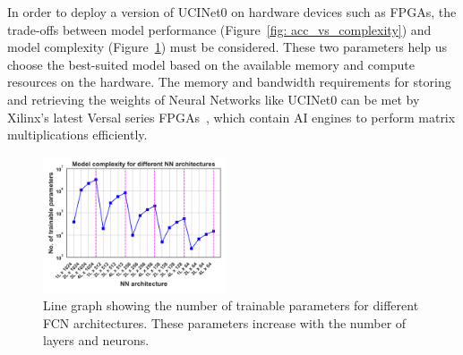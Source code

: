 \documentclass[journal]{IEEEtran}
\begin{document}
In order to deploy a version of UCINet0 on hardware devices such as FPGAs, the trade-offs between model performance (Figure~\ref{fig: acc_vs_complexity}) and model complexity (Figure~\ref{fig: weights_complexity}) must be considered. These two parameters help us choose the best-suited model based on the available memory and compute resources on the hardware. The memory and bandwidth requirements for storing and retrieving the weights of Neural Networks like UCINet0 can be met by Xilinx's latest Versal series FPGAs~\cite{wierse2023evaluation}, which contain AI engines to perform matrix multiplications efficiently.


\begin{figure}[h]
\centering
\includegraphics[width=0.48\textwidth]{Figures/Hw_num_weights_analysis_all_arch_epochs_150.png}
\caption{Line graph showing the number of trainable parameters for different FCN architectures. These parameters increase with the number of layers and neurons.}
\label{fig: weights_complexity}
\end{figure}


\end{document}
